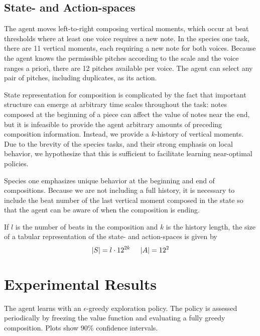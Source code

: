 \documentclass{article}
\begin{document}
    \subsection{State- and Action-spaces}
    
    The agent moves left-to-right composing vertical moments, which occur at beat thresholds where at least one voice requires a new note. In the species one task, there are 11 vertical moments, each requiring a new note for both voices. Because the agent knows the permissible pitches according to the scale and the voice ranges a prior\`i, there are 12 pitches available per voice. The agent can select any pair of pitches, including duplicates, as its action.
   
    State representation for composition is complicated by the fact that important structure can emerge at arbitrary time scales throughout the task: notes composed at the beginning of a piece can affect the value of notes near the end, but it is infeasible to provide the agent arbitrary amounts of preceding composition information. Instead, we provide a $k$-history of vertical moments. Due to the brevity of the species tasks, and their strong emphasis on local behavior, we hypothesize that this is sufficient to facilitate learning near-optimal policies.
    
    Species one emphasizes unique behavior at the beginning and end of compositions. Because we are not including a full history, it is necessary to include the beat number of the last vertical moment composed in the state so that the agent can be aware of when the composition is ending.
    
    If $l$ is the number of beats in the composition and $k$ is the history length, the size of a tabular representation of the state- and action-spaces is given by
    \begin{equation}
        |\boldmath{S}| = l \cdot 12^{2k} \hspace{0.5cm} |\boldmath{A}| = 12^2
    \end{equation}
  
    
	\section{Experimental Results}

    The agent learns with an $\epsilon$-greedy exploration policy. The policy is assessed periodically by freezing the value function and evaluating a fully greedy composition. Plots show 90\% confidence intervals.
\end{document}
